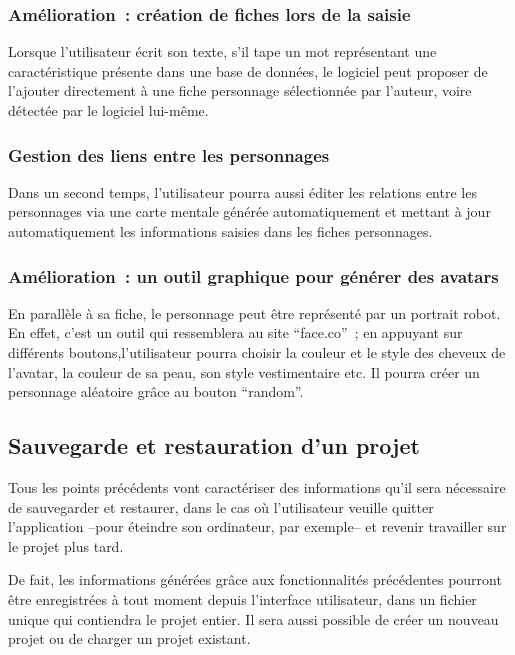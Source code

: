 \documentclass[a4paper,11pt,twoside]{article}
\begin{document}
\subsubsection{Amélioration~: création de fiches lors de la saisie}
Lorsque l'utilisateur écrit son texte, s'il tape un mot représentant une caractéristique présente dans une base de données, le logiciel peut proposer de l'ajouter directement à une fiche personnage sélectionnée par l'auteur, voire détectée par le logiciel lui-même.

\subsubsection{Gestion des liens entre les personnages}
Dans un second temps, l'utilisateur pourra aussi éditer les relations entre les personnages via une carte mentale générée automatiquement et mettant à jour automatiquement les informations saisies dans les fiches personnages.

\subsubsection{Amélioration~: un outil graphique pour générer des avatars}

En parallèle à sa fiche, le personnage peut être représenté par un portrait robot. En effet, c'est un outil qui ressemblera au site ``face.co''~; en appuyant sur différents boutons,l'utilisateur pourra choisir la couleur et le style des cheveux de l'avatar, la couleur de sa peau, son style vestimentaire etc. Il pourra créer un personnage aléatoire grâce au bouton ``random''.

\subsection{Sauvegarde et restauration d'un projet}
Tous les points précédents vont caractériser des informations qu'il sera nécessaire de sauvegarder et restaurer, dans le cas où l'utilisateur veuille quitter l'application --pour éteindre son ordinateur, par exemple-- et revenir travailler sur le projet plus tard.

De fait, les informations générées grâce aux fonctionnalités précédentes pourront être enregistrées à tout moment depuis l'interface utilisateur, dans un fichier unique qui contiendra le projet entier. Il sera aussi possible de créer un nouveau projet ou de charger un projet existant.
\end{document}
